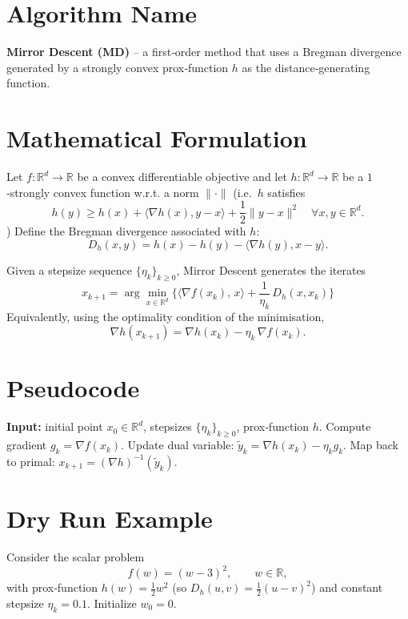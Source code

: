 \documentclass{article}
\newcommand{\grad}{\nabla}
\newcommand{\R}{\mathbb{R}}
\begin{document}
\section*{Algorithm Name}
\textbf{Mirror Descent (MD)} – a first‑order method that uses a Bregman divergence generated by a strongly convex prox‑function $h$ as the distance‑generating function.

\section*{Mathematical Formulation}
Let $f:\R^{d}\rightarrow\R$ be a convex differentiable objective and let $h:\R^{d}\rightarrow\R$ be a $1$‑strongly convex function w.r.t. a norm $\|\cdot\|$ (i.e.\ $h$ satisfies
\[
h(y)\ge h(x)+\langle\nabla h(x),y-x\rangle+\frac{1}{2}\|y-x\|^{2}\quad\forall x,y\in\R^{d}.
\])
Define the Bregman divergence associated with $h$:
\[
D_{h}(x,y)=h(x)-h(y)-\langle\nabla h(y),x-y\rangle .
\]

Given a stepsize sequence $\{\eta_{k}\}_{k\ge0}$, Mirror Descent generates the iterates
\begin{equation}
\boxed{
x_{k+1}= \arg\min_{x\in\R^{d}}\Big\{\langle \grad f(x_{k}),\,x\rangle
+\frac{1}{\eta_{k}}\,D_{h}(x,x_{k})\Big\}
}
\label{eq:update}
\end{equation}
Equivalently, using the optimality condition of the minimisation,
\[
\nabla h(x_{k+1}) = \nabla h(x_{k}) - \eta_{k}\,\grad f(x_{k}).
\tag{1}
\]

\section*{Pseudocode}
\begin{algorithm}[H]
\caption{Mirror Descent}
\begin{algorithmic}[1]
\STATE \textbf{Input:} initial point $x_{0}\in\R^{d}$, stepsizes $\{\eta_{k}\}_{k\ge0}$, prox‑function $h$.
    \STATE Compute gradient $g_{k}= \grad f(x_{k})$.
    \STATE Update dual variable: $\tilde{y}_{k}= \nabla h(x_{k})-\eta_{k}g_{k}$.
    \STATE Map back to primal: $x_{k+1}= (\nabla h)^{-1}(\tilde{y}_{k})$.
\ENDFOR
\end{algorithmic}
\end{algorithm}

\section*{Dry Run Example}
Consider the scalar problem
\[
f(w)=(w-3)^{2},\qquad w\in\R,
\]
with prox‑function $h(w)=\frac{1}{2}w^{2}$ (so $D_{h}(u,v)=\frac12(u-v)^{2}$) and constant stepsize $\eta_{k}=0.1$.
Initialize $w_{0}=0$.
\end{document}
